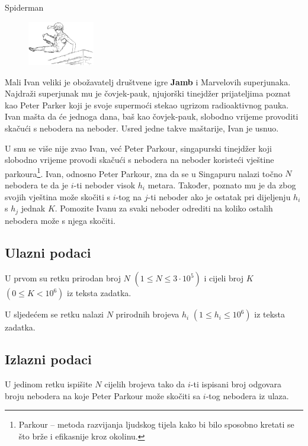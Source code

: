 \begin{statement}[
  problempoints=70,
  timelimit=1 sekunda,
  memorylimit=512 MiB,
]{Spiderman}

\setlength\intextsep{-0.1cm}
\begin{figure}
\centering
\includegraphics[width=0.26\textwidth]{img/spiderman.png}
\end{figure}

Mali Ivan veliki je obožavatelj društvene igre \textbf{Jamb} i Marvelovih
superjunaka.  Najdraži superjunak mu je čovjek-pauk, njujorški tinejdžer
prijateljima poznat kao Peter Parker koji je svoje supermoći stekao ugrizom
radioaktivnog pauka. Ivan mašta da će jednoga dana, baš kao čovjek-pauk,
slobodno vrijeme provoditi skačući s nebodera na neboder.  Usred jedne takve
maštarije, Ivan je usnuo.

U snu se više nije zvao Ivan, već Peter Parkour, singapurski tinejdžer koji
slobodno vrijeme provodi skačući s nebodera na neboder koristeći vještine
parkoura\footnote{Parkour -- metoda razvijanja ljudskog tijela kako bi bilo
sposobno kretati se što brže i efikasnije  kroz okolinu.}. Ivan, odnosno
Peter Parkour, zna da se u Singapuru nalazi točno $N$ nebodera te da je
$i$-ti neboder visok $h_i$ metara. Također, poznato mu je da zbog svojih
vještina može skočiti s $i$-tog na $j$-ti neboder ako je ostatak pri
dijeljenju $h_i$ s $h_j$ jednak $K$.  Pomozite Ivanu za svaki neboder
odrediti na koliko ostalih nebodera može s njega skočiti.

\subsection*{Ulazni podaci}
U prvom su retku prirodan broj $N$ $(1 \le N \le 3\cdot10^5)$ i cijeli broj $K$
$(0 \le K < 10^6)$ iz teksta zadatka.

U sljedećem se retku nalazi $N$ prirodnih brojeva $h_i$ $(1 \le h_i \le 10^6)$
iz teksta zadatka.

\subsection*{Izlazni podaci}
U jedinom retku ispišite $N$ cijelih brojeva tako da $i$-ti ispisani broj
odgovara broju nebodera na koje Peter Parkour može skočiti sa $i$-tog
nebodera iz ulaza.


\end{statement}
